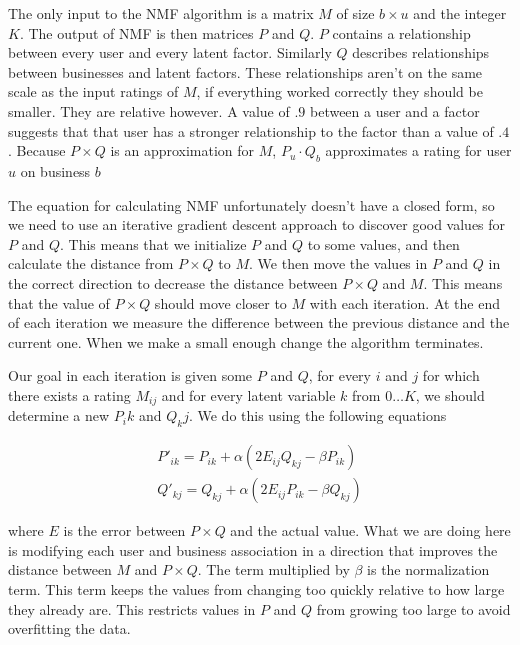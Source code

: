 The only input to the NMF algorithm is a matrix $M$ of size $b \times u$ and the
integer $K$. The output of NMF is then matrices $P$ and $Q$. $P$ contains a
relationship between every user and every latent factor. Similarly $Q$ describes
relationships between businesses and latent factors. These relationships aren't
on the same scale as the input ratings of $M$, if everything worked correctly
they should be smaller. They are relative however. A value of $.9$ between a
user and a factor suggests that that user has a stronger relationship to the
factor than a value of $.4$. Because $P \times Q$ is an approximation for $M$,
$P_u \cdot Q_b$ approximates a rating for user $u$ on business $b$

The equation for calculating NMF unfortunately doesn't have a closed form, so we
need to use an iterative gradient descent approach to discover good values for
$P$ and $Q$. This means that we initialize $P$ and $Q$ to some values, and then
calculate the distance from $P \times Q$ to $M$. We then move the values in $P$
and $Q$ in the correct direction to decrease the distance between $P \times Q$
and $M$. This means that the value of $P \times Q$ should move closer to $M$
with each iteration. At the end of each iteration we measure the difference
between the previous distance and the current one. When we make a small enough
change the algorithm terminates.

Our goal in each iteration is given some $P$ and $Q$, for every $i$ and $j$ for
which there exists a rating $M_{ij}$ and for every latent variable $k$ from
$0\ldots K$, we should determine a new $P_ik$ and $Q_kj$. We do this using the
following equations

\[
\begin{array}{c}
P'_{ik}=P_{ik} + \alpha(2E_{ij}Q_{kj}-\beta P_{ik}) \\
Q'_{kj}=Q_{kj} + \alpha(2E_{ij}P_{ik}-\beta Q_{kj})
\end{array}
\]

\noindent where $E$ is the error between $P \times Q$ and the actual value. What
we are doing here is modifying each user and business association in a direction
that improves the distance between $M$ and $P \times Q$. The term multiplied by
$\beta$ is the normalization term. This term keeps the values from changing too
quickly relative to how large they already are. This restricts values in $P$ and
$Q$ from growing too large to avoid overfitting the data.


